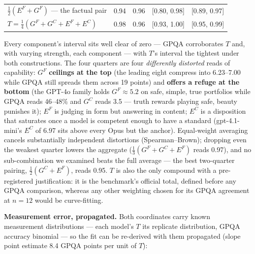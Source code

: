 \documentclass{article}
\begin{document}
\begin{table}[H]
\begin{center}
{\begin{tabular}{@{}lrrll@{}}
\(\tfrac12(E^{F}+G^{F})\) --- the factual pair &\cellcolor[HTML]{162875}\textcolor[HTML]{EEF3F8}{0.94}&\cellcolor[HTML]{11246B}\textcolor[HTML]{EEF3F8}{0.96}& {[}0.80, 0.98{]} & {[}0.89, 0.97{]}  \\
\(T = \tfrac14(G^{F}+G^{C}+E^{F}+E^{C})\) &\cellcolor[HTML]{0D2162}\textcolor[HTML]{EEF3F8}{0.98}&\cellcolor[HTML]{11246B}\textcolor[HTML]{EEF3F8}{0.96}& {[}0.93, 1.00{]} & {[}0.95, 0.99{]}  \\
\bottomrule
\end{tabular}}
\end{center}
\end{table}

Every component's interval sits well clear of zero --- GPQA corroborates \(T\) and, with varying strength, each component --- with \(T\)'s interval the tightest under both constructions. The four quarters are four \emph{differently distorted} reads of capability: \(G^{F}\) \textbf{ceilings at the top} (the leading eight compress into 6.23--7.00 while GPQA still spreads them across 19 points) and \textbf{offers a refuge at the bottom} (the GPT-4o family holds \(G^{F}\approx5.2\) on safe, simple, true portfolios while GPQA reads 46--48\% and \(G^{C}\) reads 3.5 --- truth rewards playing safe, beauty punishes it); \(E^{F}\) is judging in form but answering in content; \(E^{C}\) is a disposition that saturates once a model is competent enough to have a standard (gpt-4.1-mini's \(E^{C}\) of 6.97 sits above every Opus but the anchor). Equal-weight averaging cancels substantially independent distortions (Spearman--Brown); dropping even the weakest quarter lowers the aggregate (\(\tfrac13(G^{F}+G^{C}+E^{F})\) reads 0.97), and no sub-combination we examined beats the full average --- the best two-quarter pairing, \(\tfrac12(G^{C}+E^{F})\), reads 0.95. \(T\) is also the only compound with a pre-registered justification: it is the benchmark's official total, defined before any GPQA comparison, whereas any other weighting chosen for its GPQA agreement at \(n = 12\) would be curve-fitting.

\textbf{Measurement error, propagated.} Both coordinates carry known measurement distributions --- each model's \(T\) its replicate distribution, GPQA accuracy binomial --- so the fit can be re-derived with them propagated (slope point estimate 8.4 GPQA points per unit of \(T\)):
\end{document}

